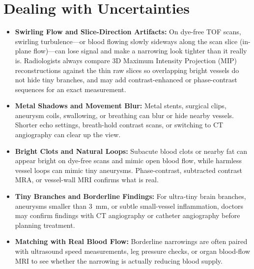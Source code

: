 \section{Dealing with Uncertainties}
\begin{itemize}
\item \textbf{Swirling Flow and Slice-Direction Artifacts:} On dye-free TOF scans, swirling turbulence---or blood flowing slowly sideways along the scan slice (in-plane flow)---can lose signal and make a narrowing look tighter than it really is. Radiologists always compare 3D Maximum Intensity Projection (MIP) reconstructions against the thin raw slices so overlapping bright vessels do not hide tiny branches, and may add contrast-enhanced or phase-contrast sequences for an exact measurement.
\item \textbf{Metal Shadows and Movement Blur:} Metal stents, surgical clips, aneurysm coils, swallowing, or breathing can blur or hide nearby vessels. Shorter echo settings, breath-hold contrast scans, or switching to CT angiography can clear up the view.
\item \textbf{Bright Clots and Natural Loops:} Subacute blood clots or nearby fat can appear bright on dye-free scans and mimic open blood flow, while harmless vessel loops can mimic tiny aneurysms. Phase-contrast, subtracted contrast MRA, or vessel-wall MRI confirms what is real.
\item \textbf{Tiny Branches and Borderline Findings:} For ultra-tiny brain branches, aneurysms smaller than 3~mm, or subtle small-vessel inflammation, doctors may confirm findings with CT angiography or catheter angiography before planning treatment.
\item \textbf{Matching with Real Blood Flow:} Borderline narrowings are often paired with ultrasound speed measurements, leg pressure checks, or organ blood-flow MRI to see whether the narrowing is actually reducing blood supply.
\end{itemize}

